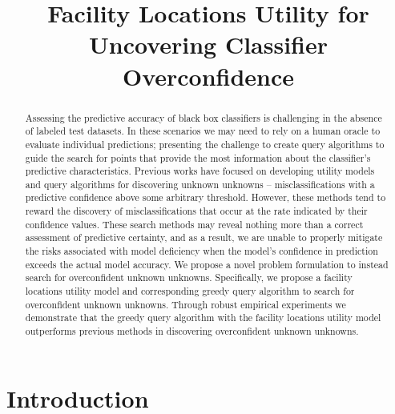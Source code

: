 \documentclass[10pt, conference]{IEEEtran}
\begin{document}
\title{Facility Locations Utility for Uncovering Classifier Overconfidence}

\author{
\and
{}
}

\maketitle

\begin{abstract}
Assessing the predictive accuracy of black box classifiers is challenging in the absence of labeled test datasets. In these scenarios we may need to rely on a human oracle to evaluate individual predictions; presenting the challenge to create query algorithms to guide the search for points that provide the most information about the classifier's predictive characteristics. Previous works have focused on developing utility models and query algorithms for discovering unknown unknowns -- misclassifications with a predictive confidence above some arbitrary threshold. However, these methods tend to reward the discovery of misclassifications that occur at the rate indicated by their confidence values.  These search methods may reveal nothing more than a correct assessment of predictive certainty, and as a result, we are unable to properly mitigate the risks associated with model deficiency when the model's confidence in prediction exceeds the actual model accuracy. We propose a novel problem formulation to instead search for overconfident unknown unknowns. Specifically, we propose a facility locations utility model and corresponding greedy query algorithm to search for overconfident unknown unknowns. Through robust empirical experiments we demonstrate that the greedy query algorithm with the facility locations utility model outperforms previous methods in discovering overconfident unknown unknowns. 
\end{abstract}


\section{Introduction}
\end{document}
